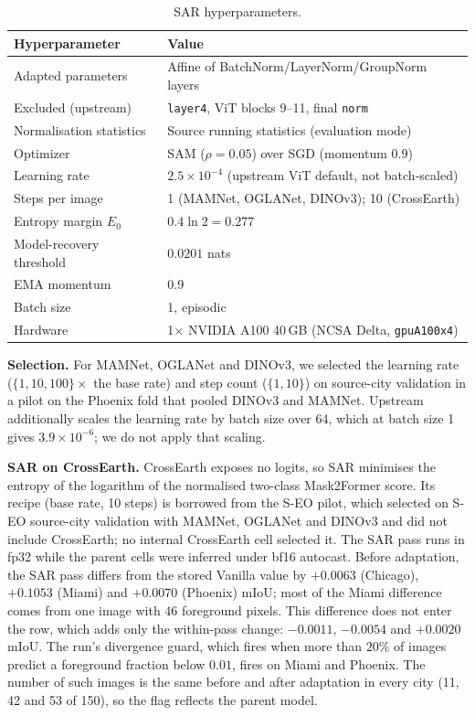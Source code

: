 \begin{table}[h]
\centering
\caption{SAR hyperparameters.}
\label{tab:sar}
\small
\begin{tabular}{@{}ll@{}}
\toprule
\textbf{Hyperparameter} & \textbf{Value} \\
\midrule
Adapted parameters       & Affine of BatchNorm/LayerNorm/GroupNorm layers \\
Excluded (upstream)      & \texttt{layer4}, ViT blocks 9--11, final \texttt{norm} \\
Normalisation statistics & Source running statistics (evaluation mode) \\
Optimizer                & SAM ($\rho{=}0.05$) over SGD (momentum 0.9) \\
Learning rate            & $2.5{\times}10^{-4}$ (upstream ViT default, not batch-scaled) \\
Steps per image          & 1 (MAMNet, OGLANet, DINOv3); 10 (CrossEarth) \\
Entropy margin $E_0$     & $0.4\ln 2 = 0.277$ \\
Model-recovery threshold & $0.0201$ nats \\
EMA momentum             & 0.9 \\
Batch size               & 1, episodic \\
\midrule
Hardware                 & 1$\times$ NVIDIA A100 40\,GB (NCSA Delta, \texttt{gpuA100x4}) \\
\bottomrule
\end{tabular}
\end{table}

\textbf{Selection.}  For MAMNet, OGLANet and DINOv3, we selected the
learning rate ($\{1, 10, 100\}\times$ the base rate) and step count
($\{1, 10\}$) on source-city validation in a pilot on the Phoenix fold
that pooled DINOv3 and MAMNet.  Upstream additionally scales the learning
rate by batch size over 64, which at batch size 1 gives
$3.9{\times}10^{-6}$; we do not apply that scaling.

\textbf{SAR on CrossEarth.}  CrossEarth exposes no logits, so SAR
minimises the entropy of the logarithm of the normalised two-class
Mask2Former score.  Its recipe (base rate, 10 steps) is borrowed from
the S-EO pilot, which selected on S-EO source-city validation with
MAMNet, OGLANet and DINOv3 and did not include CrossEarth; no internal
CrossEarth cell selected it.  The SAR pass runs in fp32 while the parent
cells were inferred under bf16 autocast.  Before adaptation, the SAR
pass differs from the stored Vanilla value by $+0.0063$ (Chicago),
$+0.1053$ (Miami) and $+0.0070$ (Phoenix) mIoU; most of the Miami
difference comes from one image with 46 foreground pixels.  This
difference does not enter the row, which adds only the within-pass
change: $-0.0011$, $-0.0054$ and $+0.0020$ mIoU.  The run's divergence
guard, which fires when more than $20\%$ of images predict a foreground
fraction below $0.01$, fires on Miami and Phoenix.  The number of such
images is the same before and after adaptation in every city (11, 42 and
53 of 150), so the flag reflects the parent model.
